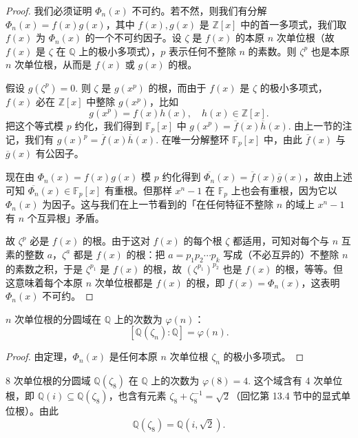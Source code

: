 \begin{proof}
我们必须证明 \(\Phi_n(x)\) 不可约。若不然，则我们有分解 \(\Phi_n(x) = f(x)g(x)\)，其中 \(f(x), g(x)\) 是 \(\mathbb{Z}[x]\) 中的首一多项式，我们取 \(f(x)\) 为 \(\Phi_n(x)\) 的一个不可约因子。设 \(\zeta\) 是 \(f(x)\) 的本原 \(n\) 次单位根（故 \(f(x)\) 是 \(\zeta\) 在 \(\mathbb{Q}\) 上的极小多项式），\(p\) 表示任何不整除 \(n\) 的素数。则 \(\zeta^p\) 也是本原 \(n\) 次单位根，从而是 \(f(x)\) 或 \(g(x)\) 的根。

假设 \(g(\zeta^p) = 0\). 则 \(\zeta\) 是 \(g(x^p)\) 的根，而由于 \(f(x)\) 是 \(\zeta\) 的极小多项式，\(f(x)\) 必在 \(\mathbb{Z}[x]\) 中整除 \(g(x^p)\)，比如
\[
g(x^p) = f(x)h(x), \quad h(x) \in \mathbb{Z}[x].
\]
把这个等式模 \(p\) 约化，我们得到 \(\mathbb{F}_p[x]\) 中 \(g(x^p) = \overline{f}(x)\overline{h}(x)\). 由上一节的注记，我们有 \(g(x)^p = \overline{f}(x)\overline{h}(x)\). 在唯一分解整环 \(\mathbb{F}_p[x]\) 中，由此 \(\overline{f}(x)\) 与 \(\overline{g}(x)\) 有公因子。

现在由 \(\Phi_n(x) = f(x)g(x)\) 模 \(p\) 约化得到 \(\overline{\Phi_n}(x) = \overline{f}(x)\overline{g}(x)\)，故由上述可知 \(\overline{\Phi_n}(x) \in \mathbb{F}_p[x]\) 有重根。但那样 \(x^n-1\) 在 \(\mathbb{F}_p\) 上也会有重根，因为它以 \(\Phi_n(x)\) 为因子。这与我们在上一节看到的「在任何特征不整除 \(n\) 的域上 \(x^n-1\) 有 \(n\) 个互异根」矛盾。

故 \(\zeta^p\) 必是 \(f(x)\) 的根。由于这对 \(f(x)\) 的每个根 \(\zeta\) 都适用，可知对每个与 \(n\) 互素的整数 \(a\)，\(\zeta^a\) 都是 \(f(x)\) 的根：把 \(a = p_1p_2\cdots p_k\) 写成（不必互异的）不整除 \(n\) 的素数之积，于是 \(\zeta^{p_1}\) 是 \(f(x)\) 的根，故 \((\zeta^{p_1})^{p_2}\) 也是 \(f(x)\) 的根，等等。但这意味着每个本原 \(n\) 次单位根都是 \(f(x)\) 的根，即 \(f(x) = \Phi_n(x)\)，这表明 \(\Phi_n(x)\) 不可约。
\end{proof}

\begin{corollary}\label{cor:13.42}
\(n\) 次单位根的分圆域在 \(\mathbb{Q}\) 上的次数为 \(\varphi(n)\)：
\[
[\mathbb{Q}(\zeta_n):\mathbb{Q}] = \varphi(n).
\]
\end{corollary}

\begin{proof}
由定理，\(\Phi_n(x)\) 是任何本原 \(n\) 次单位根 \(\zeta_n\) 的极小多项式。
\end{proof}

\begin{example}
8 次单位根的分圆域 \(\mathbb{Q}(\zeta_8)\) 在 \(\mathbb{Q}\) 上的次数为 \(\varphi(8) = 4\). 这个域含有 4 次单位根，即 \(\mathbb{Q}(i) \subseteq \mathbb{Q}(\zeta_8)\)，也含有元素 \(\zeta_8+\zeta_8^{-1} = \sqrt{2}\)（回忆第 13.4 节中的显式单位根）。由此
\[
\mathbb{Q}(\zeta_8) = \mathbb{Q}(i, \sqrt{2}).
\]
\end{example}

